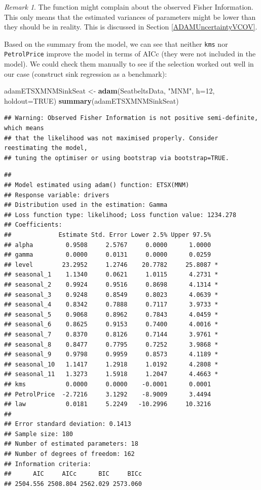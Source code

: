 \documentclass[]{book}
\newenvironment{Shaded}{\begin{snugshade}}{\end{snugshade}}
\newcommand{\DataTypeTok}[1]{\textcolor[rgb]{0.13,0.29,0.53}{#1}}
\newcommand{\DecValTok}[1]{\textcolor[rgb]{0.00,0.00,0.81}{#1}}
\newcommand{\KeywordTok}[1]{\textcolor[rgb]{0.13,0.29,0.53}{\textbf{#1}}}
\newcommand{\NormalTok}[1]{#1}
\newcommand{\OtherTok}[1]{\textcolor[rgb]{0.56,0.35,0.01}{#1}}
\newcommand{\StringTok}[1]{\textcolor[rgb]{0.31,0.60,0.02}{#1}}
\theoremstyle{definition}
\theoremstyle{definition}
\theoremstyle{definition}
\theoremstyle{definition}
\theoremstyle{remark}
\newtheorem*{remark}{Remark}
\begin{document}
\begin{remark}
The function might complain about the observed Fisher Information. This only means that the estimated variances of parameters might be lower than they should be in reality. This is discussed in Section \ref{ADAMUncertaintyVCOV}.
\end{remark}

Based on the summary from the model, we can see that neither \texttt{kms} nor \texttt{PetrolPrice} improve the model in terms of AICc (they were not included in the model). We could check them manually to see if the selection worked out well in our case (construct sink regression as a benchmark):

\begin{Shaded}
\begin{Highlighting}[]
\NormalTok{adamETSXMNMSinkSeat <-}\StringTok{ }\KeywordTok{adam}\NormalTok{(SeatbeltsData, }\StringTok{"MNM"}\NormalTok{,}
                             \DataTypeTok{h=}\DecValTok{12}\NormalTok{, }\DataTypeTok{holdout=}\OtherTok{TRUE}\NormalTok{)}
\KeywordTok{summary}\NormalTok{(adamETSXMNMSinkSeat)}
\end{Highlighting}
\end{Shaded}

\begin{verbatim}
## Warning: Observed Fisher Information is not positive semi-definite, which means
## that the likelihood was not maximised properly. Consider reestimating the model,
## tuning the optimiser or using bootstrap via bootstrap=TRUE.
\end{verbatim}

\begin{verbatim}
## 
## Model estimated using adam() function: ETSX(MNM)
## Response variable: drivers
## Distribution used in the estimation: Gamma
## Loss function type: likelihood; Loss function value: 1234.278
## Coefficients:
##             Estimate Std. Error Lower 2.5% Upper 97.5%  
## alpha         0.9508     2.5767     0.0000      1.0000  
## gamma         0.0000     0.0131     0.0000      0.0259  
## level        23.2952     1.2746    20.7782     25.8087 *
## seasonal_1    1.1340     0.0621     1.0115      4.2731 *
## seasonal_2    0.9924     0.9516     0.8698      4.1314 *
## seasonal_3    0.9248     0.8549     0.8023      4.0639 *
## seasonal_4    0.8342     0.7888     0.7117      3.9733 *
## seasonal_5    0.9068     0.8962     0.7843      4.0459 *
## seasonal_6    0.8625     0.9153     0.7400      4.0016 *
## seasonal_7    0.8370     0.8126     0.7144      3.9761 *
## seasonal_8    0.8477     0.7795     0.7252      3.9868 *
## seasonal_9    0.9798     0.9959     0.8573      4.1189 *
## seasonal_10   1.1417     1.2918     1.0192      4.2808 *
## seasonal_11   1.3273     1.5918     1.2047      4.4663 *
## kms           0.0000     0.0000    -0.0001      0.0001  
## PetrolPrice  -2.7216     3.1292    -8.9009      3.4494  
## law           0.0181     5.2249   -10.2996     10.3216  
## 
## Error standard deviation: 0.1413
## Sample size: 180
## Number of estimated parameters: 18
## Number of degrees of freedom: 162
## Information criteria:
##      AIC     AICc      BIC     BICc 
## 2504.556 2508.804 2562.029 2573.060
\end{verbatim}
\end{document}
